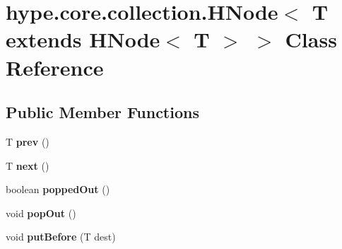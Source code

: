 \hypertarget{classhype_1_1core_1_1collection_1_1_h_node_3_01_t_01extends_01_h_node_3_01_t_01_4_01_4}{\section{hype.\-core.\-collection.\-H\-Node$<$ T extends H\-Node$<$ T $>$ $>$ Class Reference}
\label{classhype_1_1core_1_1collection_1_1_h_node_3_01_t_01extends_01_h_node_3_01_t_01_4_01_4}
}
\subsection*{Public Member Functions}
\begin{DoxyCompactItemize}
\item 
\hypertarget{classhype_1_1core_1_1collection_1_1_h_node_3_01_t_01extends_01_h_node_3_01_t_01_4_01_4_a69a526f12411c0b6830ef68a0085876b}{T {\bfseries prev} ()}\label{classhype_1_1core_1_1collection_1_1_h_node_3_01_t_01extends_01_h_node_3_01_t_01_4_01_4_a69a526f12411c0b6830ef68a0085876b}

\item 
\hypertarget{classhype_1_1core_1_1collection_1_1_h_node_3_01_t_01extends_01_h_node_3_01_t_01_4_01_4_aa3f24bb9b4b5209aaef5820b2ba3df2f}{T {\bfseries next} ()}\label{classhype_1_1core_1_1collection_1_1_h_node_3_01_t_01extends_01_h_node_3_01_t_01_4_01_4_aa3f24bb9b4b5209aaef5820b2ba3df2f}

\item 
\hypertarget{classhype_1_1core_1_1collection_1_1_h_node_3_01_t_01extends_01_h_node_3_01_t_01_4_01_4_adf59f735670f5b5cf8b357e7d9078fc9}{boolean {\bfseries popped\-Out} ()}\label{classhype_1_1core_1_1collection_1_1_h_node_3_01_t_01extends_01_h_node_3_01_t_01_4_01_4_adf59f735670f5b5cf8b357e7d9078fc9}

\item 
\hypertarget{classhype_1_1core_1_1collection_1_1_h_node_3_01_t_01extends_01_h_node_3_01_t_01_4_01_4_a2591399ea44aa7c36e352fcd595464e5}{void {\bfseries pop\-Out} ()}\label{classhype_1_1core_1_1collection_1_1_h_node_3_01_t_01extends_01_h_node_3_01_t_01_4_01_4_a2591399ea44aa7c36e352fcd595464e5}

\item 
\hypertarget{classhype_1_1core_1_1collection_1_1_h_node_3_01_t_01extends_01_h_node_3_01_t_01_4_01_4_af85efd42ecb8e4661cd83f4b6d0abdf2}{void {\bfseries put\-Before} (T dest)}\label{classhype_1_1core_1_1collection_1_1_h_node_3_01_t_01extends_01_h_node_3_01_t_01_4_01_4_af85efd42ecb8e4661cd83f4b6d0abdf2}


\end{DoxyCompactItemize}
